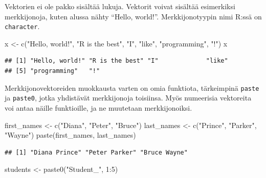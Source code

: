 \documentclass[
]{book}
\newenvironment{Shaded}{\begin{snugshade}}{\end{snugshade}}
\newcommand{\DecValTok}[1]{\textcolor[rgb]{0.00,0.00,0.81}{#1}}
\newcommand{\FunctionTok}[1]{\textcolor[rgb]{0.00,0.00,0.00}{#1}}
\newcommand{\NormalTok}[1]{#1}
\newcommand{\OtherTok}[1]{\textcolor[rgb]{0.56,0.35,0.01}{#1}}
\newcommand{\SpecialCharTok}[1]{\textcolor[rgb]{0.00,0.00,0.00}{#1}}
\newcommand{\StringTok}[1]{\textcolor[rgb]{0.31,0.60,0.02}{#1}}
\begin{document}
Vektorien ei ole pakko sisältää lukuja. Vektorit voivat sisältää esimerkiksi merkkijonoja, kuten alussa nähty ``Hello, world!''. Merkkijonotyypin nimi R:ssä on \texttt{character}.

\begin{Shaded}
\begin{Highlighting}[]
\NormalTok{x }\OtherTok{\textless{}{-}} \FunctionTok{c}\NormalTok{(}\StringTok{"Hello, world!"}\NormalTok{, }\StringTok{"R is the best"}\NormalTok{, }\StringTok{"I"}\NormalTok{, }\StringTok{"like"}\NormalTok{, }\StringTok{"programming"}\NormalTok{, }\StringTok{"!"}\NormalTok{)}
\NormalTok{x}
\end{Highlighting}
\end{Shaded}

\begin{verbatim}
## [1] "Hello, world!" "R is the best" "I"             "like"         
## [5] "programming"   "!"
\end{verbatim}

Merkkijonovektoreiden muokkausta varten on omia funktiota, tärkeimpinä \texttt{paste} ja \texttt{paste0}, jotka yhdistävät merkkijonoja toisiinsa. Myös numeerisia vektoreita voi antaa näille funktioille, ja ne muutetaan merkkijonoiksi.

\begin{Shaded}
\begin{Highlighting}[]
\NormalTok{first\_names }\OtherTok{\textless{}{-}} \FunctionTok{c}\NormalTok{(}\StringTok{"Diana"}\NormalTok{, }\StringTok{"Peter"}\NormalTok{, }\StringTok{"Bruce"}\NormalTok{)}
\NormalTok{last\_names }\OtherTok{\textless{}{-}} \FunctionTok{c}\NormalTok{(}\StringTok{"Prince"}\NormalTok{, }\StringTok{"Parker"}\NormalTok{, }\StringTok{"Wayne"}\NormalTok{)}
\FunctionTok{paste}\NormalTok{(first\_names, last\_names)}
\end{Highlighting}
\end{Shaded}

\begin{verbatim}
## [1] "Diana Prince" "Peter Parker" "Bruce Wayne"
\end{verbatim}

\begin{Shaded}
\begin{Highlighting}[]
\NormalTok{students }\OtherTok{\textless{}{-}} \FunctionTok{paste0}\NormalTok{(}\StringTok{"Student\_"}\NormalTok{, }\DecValTok{1}\SpecialCharTok{:}\DecValTok{5}\NormalTok{)}
\end{Highlighting}
\end{Shaded}
\end{document}
